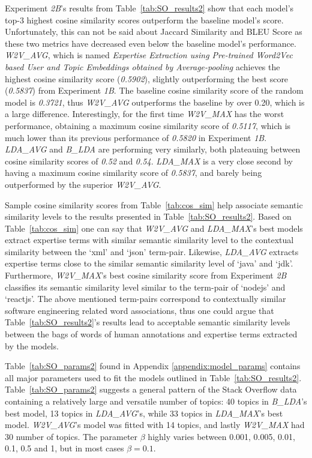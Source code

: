             Experiment \emph{2B}'s results from Table~\ref{tab:SO_results2} show that each model's top-$3$ highest cosine similarity scores outperform the baseline model's score. Unfortunately, this can not be said about Jaccard Similarity and BLEU Score as these two metrics have decreased even below the baseline model's performance. \emph{W2V\_AVG}, which is named \emph{Expertise Extraction using Pre-trained Word2Vec based User and Topic Embeddings obtained by Average-pooling} achieves the highest cosine similarity score (\emph{0.5902}), slightly outperforming the best score (\emph{0.5837}) from Experiment \emph{1B}. The baseline cosine similarity score of the random model is \emph{0.3721}, thus \emph{W2V\_AVG} outperforms the baseline by over 0.20, which is a large difference. Interestingly, for the first time \emph{W2V\_MAX} has the worst performance, obtaining a maximum cosine similarity score of \emph{0.5117}, which is much lower than its previous performance of \emph{0.5820} in Experiment \emph{1B}. \emph{LDA\_AVG} and \emph{B\_LDA} are performing very similarly, both plateauing between cosine similarity scores of \emph{0.52} and \emph{0.54}. \emph{LDA\_MAX} is a very close second by having a maximum cosine similarity score of \emph{0.5837}, and barely being outperformed by the superior \emph{W2V\_AVG}.
            
            Sample cosine similarity scores from Table~\ref{tab:cos_sim} help associate semantic similarity levels to the results presented in Table~\ref{tab:SO_results2}. Based on Table~\ref{tab:cos_sim} one can say that \emph{W2V\_AVG} and \emph{LDA\_MAX}'s best models extract expertise terms with similar semantic similarity level to the contextual similarity between the `xml' and `json' term-pair. Likewise, \emph{LDA\_AVG} extracts expertise terms close to the similar semantic similarity level of `java' and `jdk'. Furthermore, \emph{W2V\_MAX}'s best cosine similarity score from Experiment \emph{2B} classifies its semantic similarity level similar to the term-pair of `nodejs' and `reactjs'. The above mentioned term-pairs correspond to contextually similar software engineering related word associations, thus one could argue that Table~\ref{tab:SO_results2}'s results lead to acceptable semantic similarity levels between the bags of words of human annotations and expertise terms extracted by the models.
            
            Table~\ref{tab:SO_params2} found in Appendix \ref{appendix:model_params} contains all major parameters used to fit the models outlined in Table~\ref{tab:SO_results2}. Table~\ref{tab:SO_params2} suggests a general pattern of the Stack Overflow data containing a relatively large and versatile number of topics: 40 topics in \emph{B\_LDA}'s best model, 13 topics in \emph{LDA\_AVG}'s, while 33 topics in \emph{LDA\_MAX}'s best model. \emph{W2V\_AVG}'s model was fitted with 14 topics, and lastly  \emph{W2V\_MAX} had 30 number of topics. The parameter $\beta$ highly varies between 0.001, 0.005, 0.01, 0.1, 0.5 and 1, but in most cases $\beta=0.1$.
            
